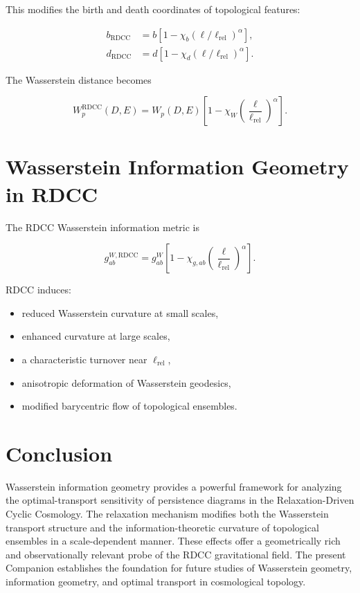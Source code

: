 \documentclass[11pt,a4paper]{article}
\begin{document}
This modifies the birth and death coordinates of topological features:

\begin{align}
    b_{\mathrm{RDCC}} &= b \left[ 1 - \chi_{b} (\ell/\ell_{\mathrm{rel}})^{\alpha} \right], \\
    d_{\mathrm{RDCC}} &= d \left[ 1 - \chi_{d} (\ell/\ell_{\mathrm{rel}})^{\alpha} \right].
\end{align}

The Wasserstein distance becomes

\begin{equation}
    W_{p}^{\mathrm{RDCC}}(D,E)
    = W_{p}(D,E)
      \left[
        1 - \chi_{W}
        \left(\frac{\ell}{\ell_{\mathrm{rel}}}\right)^{\alpha}
      \right].
\end{equation}
\section{Wasserstein Information Geometry in RDCC}

The RDCC Wasserstein information metric is

\begin{equation}
    g^{W,\mathrm{RDCC}}_{ab}
    = g^{W}_{ab}
      \left[
        1 - \chi_{g,ab}
        \left(\frac{\ell}{\ell_{\mathrm{rel}}}\right)^{\alpha}
      \right].
\end{equation}

RDCC induces:

\begin{itemize}
    \item reduced Wasserstein curvature at small scales,
    \item enhanced curvature at large scales,
    \item a characteristic turnover near $\ell_{\mathrm{rel}}$,
    \item anisotropic deformation of Wasserstein geodesics,
    \item modified barycentric flow of topological ensembles.
\end{itemize}
\section{Conclusion}

Wasserstein information geometry provides a powerful framework for analyzing the 
optimal-transport sensitivity of persistence diagrams in the Relaxation-Driven 
Cyclic Cosmology. The relaxation mechanism modifies both the Wasserstein transport 
structure and the information-theoretic curvature of topological ensembles in a 
scale-dependent manner. These effects offer a geometrically rich and 
observationally relevant probe of the RDCC gravitational field. The present 
Companion establishes the foundation for future studies of Wasserstein geometry, 
information geometry, and optimal transport in cosmological topology.


\nocite{*}

\end{document}
